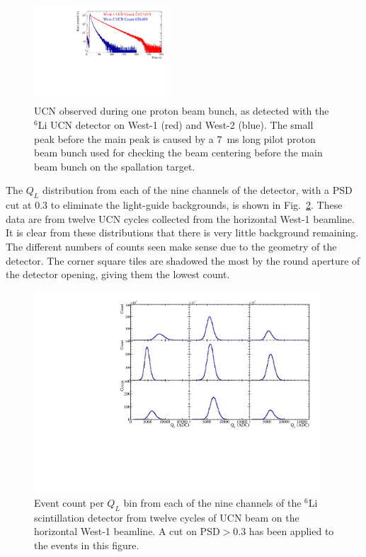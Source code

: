 \documentclass[twocolumn]{bmcart}
\begin{document}
\begin{figure}[htpb] 
\begin{center} 
\includegraphics[width=0.45\textwidth]{figures/run54_to_run40_bunch0_compare.pdf} 
\caption{ UCN observed during one proton beam bunch, as detected with
  the $^6$Li UCN detector on West-1 (red) and West-2 (blue).  The
  small peak before the main peak is caused by a 7~ms long pilot
  proton beam bunch used for checking the beam centering before the
  main beam bunch on the spallation target. }
\label{fig:protonCycle} 
\end{center} 
\end{figure}

The $Q_L$ distribution from each of the nine channels of the detector,
with a PSD cut at 0.3 to eliminate the light-guide backgrounds, is
shown in Fig.~\ref{fig:nineup}.  These data are from twelve UCN cycles
collected from the horizontal West-1 beamline.  It is clear from these
distributions that there is very little background remaining.  The
different numbers of counts seen make sense due to the geometry of the
detector.  The corner square tiles are shadowed the most by the round
aperture of the detector opening, giving them the lowest count.

\begin{figure}[!htpb]
\centering
\includegraphics[width=0.95\textwidth]{figures/nineup.pdf}
\caption{ Event count per $Q_L$ bin from each of the nine channels of
  the $^{6}$Li scintillation detector from twelve cycles of UCN beam
  on the horizontal West-1 beamline.  A cut on PSD$>0.3$ has been
  applied to the events in this figure.}
\label{fig:nineup}
\end{figure}
\end{document}
